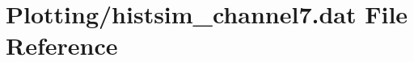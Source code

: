 \hypertarget{Plotting_2histsim__channel7_8dat}{}\section{Plotting/histsim\+\_\+channel7.dat File Reference}
\label{Plotting_2histsim__channel7_8dat}
